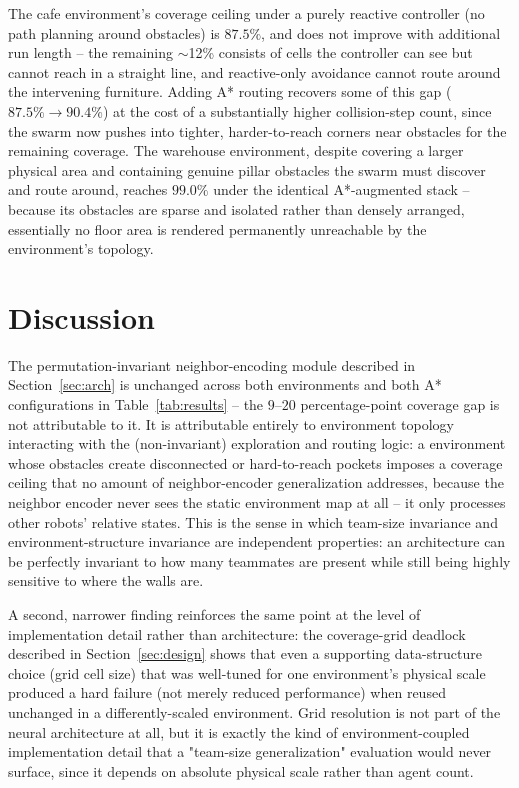 \documentclass[12pt]{article}
\begin{document}
The cafe environment's coverage ceiling under a purely reactive controller
(no path planning around obstacles) is $87.5\%$, and does not improve with
additional run length -- the remaining $\sim$12\% consists of cells the
controller can see but cannot reach in a straight line, and reactive-only
avoidance cannot route around the intervening furniture. Adding A* routing
recovers some of this gap ($87.5\%\to90.4\%$) at the cost of a substantially
higher collision-step count, since the swarm now pushes into tighter,
harder-to-reach corners near obstacles for the remaining coverage. The
warehouse environment, despite covering a larger physical area and containing
genuine pillar obstacles the swarm must discover and route around, reaches
$99.0\%$ under the identical A*-augmented stack -- because its obstacles are
sparse and isolated rather than densely arranged, essentially no floor area
is rendered permanently unreachable by the environment's topology.

\section{Discussion}
The permutation-invariant neighbor-encoding module described in
Section~\ref{sec:arch} is unchanged across both environments and both A*
configurations in Table~\ref{tab:results} -- the $9$--$20$ percentage-point
coverage gap is not attributable to it. It is attributable entirely to
environment topology interacting with the (non-invariant) exploration and
routing logic: a environment whose obstacles create disconnected or
hard-to-reach pockets imposes a coverage ceiling that no amount of
neighbor-encoder generalization addresses, because the neighbor encoder never
sees the static environment map at all -- it only processes other robots'
relative states. This is the sense in which team-size invariance and
environment-structure invariance are independent properties: an architecture
can be perfectly invariant to how many teammates are present while still
being highly sensitive to where the walls are.

A second, narrower finding reinforces the same point at the level of
implementation detail rather than architecture: the coverage-grid deadlock
described in Section~\ref{sec:design} shows that even a supporting
data-structure choice (grid cell size) that was well-tuned for one
environment's physical scale produced a hard failure (not merely reduced
performance) when reused unchanged in a differently-scaled environment. Grid
resolution is not part of the neural architecture at all, but it is exactly
the kind of environment-coupled implementation detail that a "team-size
generalization" evaluation would never surface, since it depends on absolute
physical scale rather than agent count.
\end{document}
